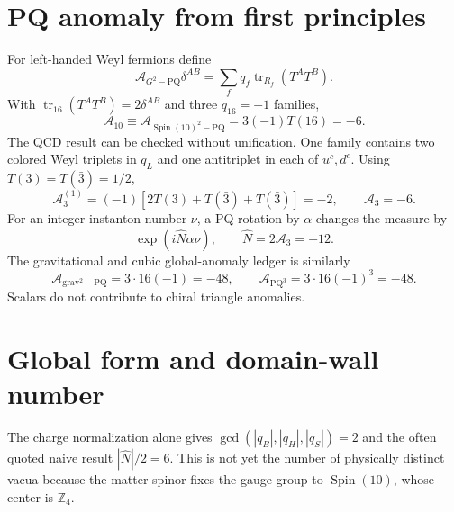 \documentclass[11pt]{article}
\newcommand{\Spin}{\operatorname{Spin}}
\newcommand{\A}{\mathcal A}
\begin{document}
\section{PQ anomaly from first principles}

For left-handed Weyl fermions define
\begin{equation}
 \A_{G^2-\mathrm{PQ}}\delta^{AB}
 =\sum_f q_f\operatorname{tr}_{R_f}(T^AT^B).
\end{equation}
With $\operatorname{tr}_{16}(T^AT^B)=2\delta^{AB}$ and three
$q_{16}=-1$ families,
\begin{equation}
 \boxed{\mathcal A_{10}\equiv\A_{\Spin(10)^2-\mathrm{PQ}}
 =3(-1)T(16)=-6.}
 \label{eq:a10}
\end{equation}
The QCD result can be checked without unification.  One family contains two
colored Weyl triplets in $q_L$ and one antitriplet in each of $u^c,d^c$.
Using $T(3)=T(\bar3)=1/2$,
\begin{equation}
 \A_{3}^{(1)}=(-1)\left[2T(3)+T(\bar3)+T(\bar3)\right]=-2,
 \qquad \A_3=-6.
\end{equation}
For an integer instanton number $\nu$, a PQ rotation by $\alpha$ changes the
measure by
\begin{equation}
 \exp(i\widehat N\alpha\nu),\qquad
 \widehat N=2\A_3=-12.
 \label{eq:nhat}
\end{equation}
The gravitational and cubic global-anomaly ledger is similarly
\begin{equation}
 \A_{\mathrm{grav}^2-\mathrm{PQ}}=3\cdot16(-1)=-48,
 \qquad \A_{\mathrm{PQ}^3}=3\cdot16(-1)^3=-48.
\end{equation}
Scalars do not contribute to chiral triangle anomalies.

\section{Global form and domain-wall number}

The charge normalization alone gives $\gcd(|q_B|,|q_H|,|q_S|)=2$ and the
often quoted naive result $|\widehat N|/2=6$.  This is not yet the number of
physically distinct vacua because the matter spinor fixes the gauge group to
$\Spin(10)$, whose center is $\mathbb Z_4$.
\end{document}
